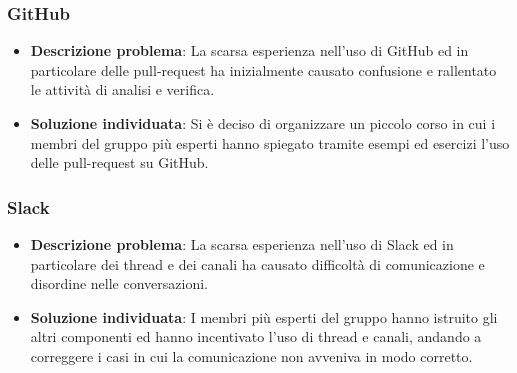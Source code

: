 	\subsubsection{GitHub}
		\begin{itemize}
		\item \textbf{Descrizione problema}: La scarsa esperienza nell'uso di GitHub ed in particolare delle pull-request ha inizialmente causato confusione e rallentato le attività di analisi e verifica.
		\item \textbf{Soluzione individuata}: Si è deciso di organizzare un piccolo corso in cui i membri del gruppo più esperti hanno spiegato tramite esempi ed esercizi l'uso delle pull-request su GitHub. 
		\end{itemize}
	\subsubsection{Slack}
		\begin{itemize}
			\item \textbf{Descrizione problema}: La scarsa esperienza nell'uso di Slack ed in particolare dei thread e dei canali ha causato difficoltà di comunicazione e disordine nelle conversazioni.
			\item \textbf{Soluzione individuata}: I membri più esperti del gruppo hanno istruito gli altri componenti ed hanno incentivato l'uso di thread e canali, andando a correggere i casi in cui la comunicazione non avveniva in modo corretto. 
		\end{itemize}